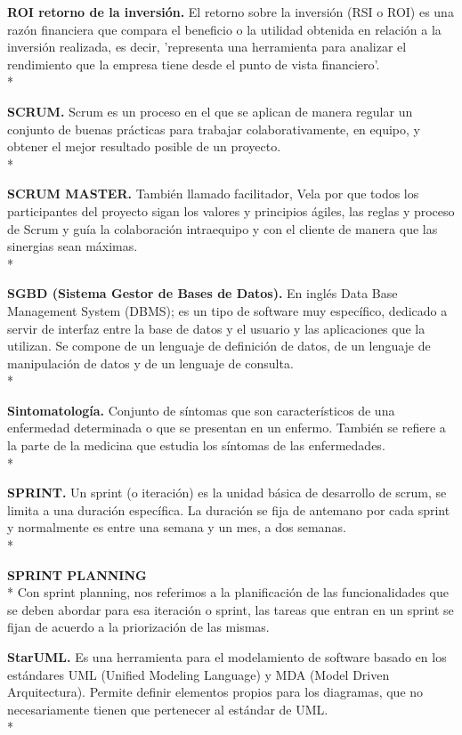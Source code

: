 \documentclass[../pfc.tex]{subfiles}
\begin{document}
	\textbf{ROI retorno de la inversión.}
	El retorno sobre la inversión (RSI o ROI) es una razón financiera que compara el beneficio o la utilidad obtenida en relación a la inversión realizada, es decir, 'representa una herramienta para analizar el rendimiento que la empresa tiene desde el punto de vista financiero'.\\*	
	
	\textbf{SCRUM.}
	Scrum es un proceso en el que se aplican de manera regular un conjunto de buenas prácticas para trabajar colaborativamente, en equipo, y obtener el mejor resultado posible de un proyecto.\\*
		
	\textbf{SCRUM MASTER.}	
	También llamado facilitador, Vela por que todos los participantes del proyecto sigan los valores y principios ágiles, las reglas y proceso de Scrum y guía la colaboración intraequipo y con el cliente de manera que las sinergias sean máximas.\\* 
	
	\textbf{SGBD (Sistema Gestor de Bases de Datos).}
	En inglés Data Base Management System (DBMS); es un tipo de software muy específico, dedicado a servir de interfaz entre la base de datos y el usuario y las aplicaciones que la utilizan. Se compone de un lenguaje de definición de datos, de un lenguaje de manipulación de datos y de un lenguaje de consulta.\\*
	
	\textbf{Sintomatología.}
	Conjunto de síntomas que son característicos de una enfermedad determinada o que se presentan en un enfermo.
	También se refiere a la parte de la medicina que estudia los síntomas de las enfermedades.\\*
	
	\textbf{SPRINT.}
	Un sprint (o iteración) es la unidad básica de desarrollo de scrum, se limita a una duración específica.
	La duración se fija de antemano por cada sprint y normalmente es entre una semana y un mes, a dos semanas.\\*
	
	\textbf{SPRINT PLANNING}\\*
	Con sprint planning, nos referimos a la planificación de las funcionalidades que se deben abordar para esa iteración o sprint, las tareas que entran en un sprint se fijan de acuerdo a la priorización de las mismas. 
	
	\textbf{StarUML.}
	Es una herramienta para el modelamiento de software basado en los estándares UML (Unified Modeling Language) y MDA (Model Driven Arquitectura). Permite definir elementos propios para los diagramas, que no necesariamente tienen que pertenecer al estándar de UML.\\*
	
\end{document}
